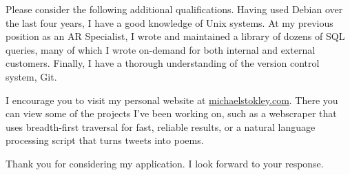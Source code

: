 \documentclass[10pt,a4paper,sans]{moderncv}        %
\begin{document}
Please consider the following additional qualifications. Having used Debian over
the last four years, I have a good knowledge of Unix systems. At my previous
position as an AR Specialist, I wrote and maintained a library of dozens of SQL
queries, many of which I wrote on-demand for both internal and external
customers. Finally, I have a thorough understanding of the version control
system, Git.

I encourage you to visit my personal website at
{\href{http://michaelstokley.com}{michaelstokley.com}}. There you can view some
of the projects I've been working on, such as a webscraper that uses
breadth-first traversal for fast, reliable results, or a natural language
processing script that turns tweets into poems. 

Thank you for considering my application. I look forward to your response.

\makeletterclosing
\end{document}
